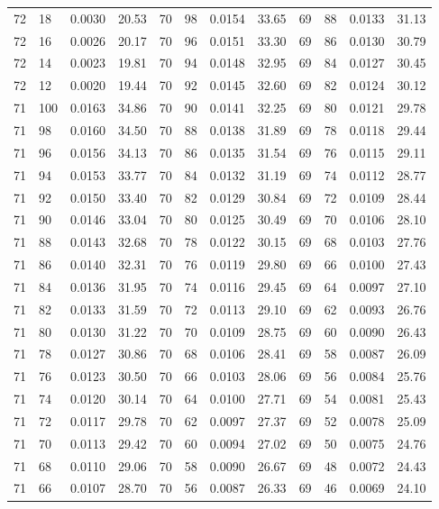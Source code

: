 \begin{tabular}{llll|llll|llll}
72 & 18 & 0.0030 & 20.53 & 70 & 98 & 0.0154 & 33.65 & 69 & 88 & 0.0133 & 31.13\\
72 & 16 & 0.0026 & 20.17 & 70 & 96 & 0.0151 & 33.30 & 69 & 86 & 0.0130 & 30.79\\
72 & 14 & 0.0023 & 19.81 & 70 & 94 & 0.0148 & 32.95 & 69 & 84 & 0.0127 & 30.45\\
72 & 12 & 0.0020 & 19.44 & 70 & 92 & 0.0145 & 32.60 & 69 & 82 & 0.0124 & 30.12\\
71 & 100 & 0.0163 & 34.86 & 70 & 90 & 0.0141 & 32.25 & 69 & 80 & 0.0121 & 29.78\\
71 & 98 & 0.0160 & 34.50 & 70 & 88 & 0.0138 & 31.89 & 69 & 78 & 0.0118 & 29.44\\
71 & 96 & 0.0156 & 34.13 & 70 & 86 & 0.0135 & 31.54 & 69 & 76 & 0.0115 & 29.11\\
71 & 94 & 0.0153 & 33.77 & 70 & 84 & 0.0132 & 31.19 & 69 & 74 & 0.0112 & 28.77\\
71 & 92 & 0.0150 & 33.40 & 70 & 82 & 0.0129 & 30.84 & 69 & 72 & 0.0109 & 28.44\\
71 & 90 & 0.0146 & 33.04 & 70 & 80 & 0.0125 & 30.49 & 69 & 70 & 0.0106 & 28.10\\
71 & 88 & 0.0143 & 32.68 & 70 & 78 & 0.0122 & 30.15 & 69 & 68 & 0.0103 & 27.76\\
71 & 86 & 0.0140 & 32.31 & 70 & 76 & 0.0119 & 29.80 & 69 & 66 & 0.0100 & 27.43\\
71 & 84 & 0.0136 & 31.95 & 70 & 74 & 0.0116 & 29.45 & 69 & 64 & 0.0097 & 27.10\\
71 & 82 & 0.0133 & 31.59 & 70 & 72 & 0.0113 & 29.10 & 69 & 62 & 0.0093 & 26.76\\
71 & 80 & 0.0130 & 31.22 & 70 & 70 & 0.0109 & 28.75 & 69 & 60 & 0.0090 & 26.43\\
71 & 78 & 0.0127 & 30.86 & 70 & 68 & 0.0106 & 28.41 & 69 & 58 & 0.0087 & 26.09\\
71 & 76 & 0.0123 & 30.50 & 70 & 66 & 0.0103 & 28.06 & 69 & 56 & 0.0084 & 25.76\\
71 & 74 & 0.0120 & 30.14 & 70 & 64 & 0.0100 & 27.71 & 69 & 54 & 0.0081 & 25.43\\
71 & 72 & 0.0117 & 29.78 & 70 & 62 & 0.0097 & 27.37 & 69 & 52 & 0.0078 & 25.09\\
71 & 70 & 0.0113 & 29.42 & 70 & 60 & 0.0094 & 27.02 & 69 & 50 & 0.0075 & 24.76\\
71 & 68 & 0.0110 & 29.06 & 70 & 58 & 0.0090 & 26.67 & 69 & 48 & 0.0072 & 24.43\\
71 & 66 & 0.0107 & 28.70 & 70 & 56 & 0.0087 & 26.33 & 69 & 46 & 0.0069 & 24.10\\

\end{tabular}
